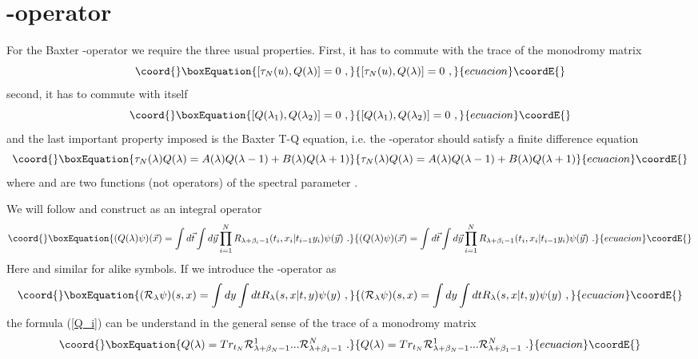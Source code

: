 \documentclass[a4paper,11pt]{article}
\begin{document}
\section{\coordHE{}-operator}

For the Baxter \coordHE{}-operator we require the three usual properties. First, it
has to commute with the trace of the monodromy matrix \coordHE{}
\begin{equation}\coord{}\boxEquation{
\label{tauQ}
[\tau_N(u),Q(\lambda )]=0 ~,
}{
[\tau_N(u),Q(\lambda )]=0 ~,
}{ecuacion}\coordE{}\end{equation}
second, it has to commute with itself
\begin{equation}\coord{}\boxEquation{
\label{QQ}
[Q(\lambda_1),Q(\lambda_2)]=0 ~,
}{
[Q(\lambda_1),Q(\lambda_2)]=0 ~,
}{ecuacion}\coordE{}\end{equation}
and the last important property imposed is the Baxter T-Q equation, i.e. the
\coordHE{}-operator should satisfy a finite difference equation
\begin{equation}\coord{}\boxEquation{
\label{TQ}
\tau_N(\lambda )Q(\lambda )=A(\lambda)Q(\lambda -1)+B(\lambda)Q(\lambda +1)
}{
\tau_N(\lambda )Q(\lambda )=A(\lambda)Q(\lambda -1)+B(\lambda)Q(\lambda +1)
}{ecuacion}\coordE{}\end{equation}
where \coordHE{} and \coordHE{} are two functions (not operators) of
the spectral parameter \myHighlight{$\lambda$}\coordHE{} .

We will follow \cite {Sky} and construct \coordHE{} as an integral
operator
\begin{equation}\coord{}\boxEquation{
\label{Q_i}
(Q(\lambda )\psi)({\vec x})
       =\int d{\vec t}\int d{\vec y}
       \prod _{i=1}^N R_{\lambda +\beta_i-1}(t_i,x_i|t_{i-1}y_i)\psi({\vec y}) ~.
}{
(Q(\lambda )\psi)({\vec x})
       =\int d{\vec t}\int d{\vec y}
       \prod _{i=1}^N R_{\lambda +\beta_i-1}(t_i,x_i|t_{i-1}y_i)\psi({\vec y}) ~.
}{ecuacion}\coordE{}\end{equation}
Here \coordHE{} and similar for alike symbols. If we introduce
the \coordHE{}-operator as
\begin{equation}\coord{}\boxEquation{
\label{intR}
({\cal R}_\lambda \psi )(s,x)=\int dy \int dt R_{\lambda}(s,x|t,y)\psi (y) ~,
}{
({\cal R}_\lambda \psi )(s,x)=\int dy \int dt R_{\lambda}(s,x|t,y)\psi (y) ~,
}{ecuacion}\coordE{}\end{equation}
the formula (\ref{Q_i}) can be understand in the general sense of the trace
of a monodromy matrix
\begin{equation}\coord{}\boxEquation{
\label{Qtr}
Q(\lambda)=Tr_{t_N}{\cal R}_{\lambda +\beta_N-1}^1...{\cal R}_{\lambda +\beta_1-1}^N ~.
}{
Q(\lambda)=Tr_{t_N}{\cal R}_{\lambda +\beta_N-1}^1...{\cal R}_{\lambda +\beta_1-1}^N ~.
}{ecuacion}\coordE{}\end{equation}
\end{document}
